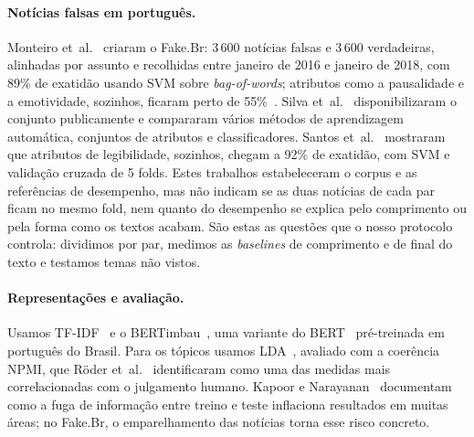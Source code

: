 \paragraph{Notícias falsas em português.}
Monteiro et~al.~\cite{monteiro2018} criaram o Fake.Br: 3\,600 notícias falsas e 3\,600 verdadeiras,
alinhadas por assunto e recolhidas entre janeiro de 2016 e janeiro de 2018, com 89\% de exatidão
usando SVM sobre \emph{bag-of-words}; atributos como a pausalidade e a emotividade, sozinhos, ficaram
perto de 55\%~\cite{santos2020}. Silva et~al.~\cite{silva2020} disponibilizaram o conjunto
publicamente e compararam vários métodos de aprendizagem automática, conjuntos de atributos e
classificadores. Santos et~al.~\cite{santos2020} mostraram que atributos de legibilidade, sozinhos,
chegam a 92\% de exatidão, com SVM e validação cruzada de 5 folds. Estes trabalhos estabeleceram o
corpus e as referências de desempenho, mas não indicam se as duas notícias de cada par ficam no mesmo
fold, nem quanto do desempenho se explica pelo comprimento ou pela forma como os textos acabam. São
estas as questões que o nosso protocolo controla: dividimos por par, medimos as \emph{baselines} de
comprimento e de final do texto e testamos temas não vistos.

\paragraph{Representações e avaliação.}
Usamos TF-IDF~\cite{manning2008} e o BERTimbau~\cite{souza2020}, uma variante do BERT~\cite{devlin2019}
pré-treinada em português do Brasil. Para os tópicos usamos LDA~\cite{blei2003}, avaliado com a
coerência NPMI, que Röder et~al.~\cite{roder2015} identificaram como uma das medidas mais
correlacionadas com o julgamento humano. Kapoor e Narayanan~\cite{kapoor2023} documentam como a
fuga de informação entre treino e teste inflaciona resultados em muitas áreas; no Fake.Br, o
emparelhamento das notícias torna esse risco concreto.
